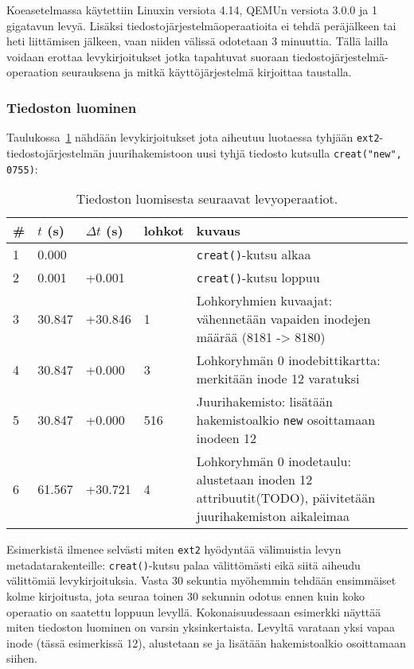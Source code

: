 Koeasetelmassa käytettiin Linuxin versiota 4.14, QEMUn versiota 3.0.0 ja 1 gigatavun levyä.
Lisäksi tiedostojärjestelmäoperaatioita ei tehdä peräjälkeen tai heti liittämisen jälkeen,
vaan niiden välissä odotetaan 3 minuuttia.
Tällä lailla voidaan erottaa levykirjoitukset jotka tapahtuvat suoraan tiedostojärjestelmä-operaation seurauksena
ja mitkä käyttöjärjestelmä kirjoittaa taustalla. 

\subsubsection{Tiedoston luominen}
\label{ChapExt2FileCreation}
Taulukossa~\ref{TabExt2Creation} nähdään levykirjoitukset jota aiheutuu luotaessa tyhjään \texttt{ext2}-tiedostojärjestelmän juurihakemistoon uusi tyhjä tiedosto kutsulla \texttt{creat("new", 0755)}:

\begin{table}[H]
\label{TabExt2Creation}
\begin{tabular}{l | l | l | l | p{7cm}}
    \# & $t$ (s) & $\Delta t$ (s) & lohkot & kuvaus \\ \hline \hline
    1  & 0.000    &          &     & \texttt{creat()}-kutsu alkaa   \\ \hline %
    2  & 0.001    & +0.001   &     & \texttt{creat()}-kutsu loppuu  \\ \hline %
    3  & 30.847   & +30.846  & 1   & Lohkoryhmien kuvaajat: vähennetään vapaiden inodejen määrää (8181 -> 8180)         \\ \hline %
    4  & 30.847   & +0.000   & 3   & Lohkoryhmän 0 inodebittikartta: merkitään inode 12 varatuksi \\ \hline %
    5  & 30.847   & +0.000   & 516 & Juurihakemisto: lisätään hakemistoalkio \texttt{new} osoittamaan inodeen 12                 \\ \hline %
    6  & 61.567   & +30.721  & 4   & Lohkoryhmän 0 inodetaulu: alustetaan inoden 12 attribuutit(TODO), päivitetään juurihakemiston aikaleimaa \\        %
\end{tabular}
\caption{Tiedoston luomisesta seuraavat levyoperaatiot.}
\end{table}

Esimerkistä ilmenee selvästi miten \texttt{ext2} hyödyntää välimuistia levyn metadatarakenteille: \texttt{creat()}-kutsu palaa välittömästi eikä siitä aiheudu välittömiä levykirjoituksia.
Vasta 30 sekuntia myöhemmin tehdään ensimmäiset kolme kirjoitusta,
jota seuraa toinen 30 sekunnin odotus ennen kuin koko operaatio on saatettu loppuun levyllä.
Kokonaisuudessaan esimerkki näyttää miten tiedoston luominen on varsin yksinkertaista.
Levyltä varataan yksi vapaa inode (tässä esimerkissä 12), alustetaan se ja lisätään hakemistoalkio osoittamaan siihen.

